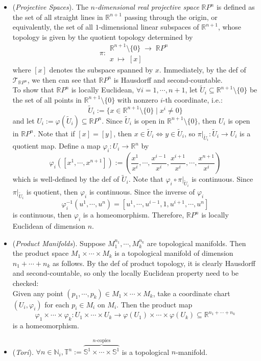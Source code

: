 \begin{itemize}
    \item (\textit{Projective Spaces}). The \textit{$n$-dimensional real projective space} $\mathbb{R}P^n$ is defined as the set of all straight lines in $\mathbb{R}^{n+1}$ passing through the origin, or equivalently, the set of all $1$-dimensional linear subspaces of $\mathbb{R}^{n+1}$, whose topology is given by the quotient topology determined by 
    $$\pi: \substack{\mathbb{R}^{n+1} \setminus \{0\} \;\to\; \mathbb{R}P^n\\
    x\;\mapsto\; [x]}$$
    where $[x]$ denotes the subspace spanned by $x$. Immediately, by the def of $\mathcal{T}_{\mathbb{R}P^n}$, we then can see that $\mathbb{R}P^n$ is Hausdorff and second-countable.\\
    To show that $\mathbb{R}P^n$ is locally Euclidean, $\forall i=1,\cdots, n+1$, let $\tilde{U}_i \subseteq \mathbb{R}^{n+1} \setminus \{0\}$ be the set of all points in $\mathbb{R}^{n+1} \setminus \{0\}$ with nonzero $i$-th coordinate, i.e.:
    \[
    \tilde{U}_i:= \{x\in \mathbb{R}^{n+1} \setminus \{0\} \mid x^i \neq 0\}
    \]
    and let $U_i:= \varphi(\tilde{U}_i) \subseteq \mathbb{R}P^n$. Since $\tilde{U}_i$ is open in $\mathbb{R}^{n+1} \setminus \{0\}$, then $U_i$ is open in $\mathbb{R}P^n$. Note that if $[x]=[y]$, then $x\in \tilde{U}_i \Leftrightarrow y\in \tilde{U}_i$, so $\pi|_{\tilde{U}_i}: \tilde{U}_i\to U_i$ is a quotient map. Define a map $\varphi_i: U_i \to \mathbb{R}^n$ by
    \[
    \varphi_i([x^1 ,\cdots, x^{n+1}]):= (\frac{x^1}{x^i} ,\cdots, \frac{x^{i-1}}{x^i} ,\frac{x^{i+1}}{x^i} ,\cdots, \frac{x^{n+1}}{x^i})
    \]
    which is well-defined by the def of $\tilde{U}_i$. Note that $\varphi_i \circ \pi|_{\tilde{U}_i}$ is continuous. Since $\pi|_{\tilde{U}_i}$ is quotient, then $\varphi_i$ is continuous. Since the inverse of $\varphi_i$
    \[
    \varphi_i^{-1}(u^1 ,\cdots, u^n)= [u^1 ,\cdots, u^{i-1},1, u^{i+1}, \cdots, u^n]
    \]
    is continuous, then $\varphi_i$ is a homeomorphism. Therefore, $\mathbb{R}P^n$ is locally Euclidean of dimension $n$.

    \item (\textit{Product Manifolds}). Suppose $M_1^{n_1} ,\cdots ,M_k^{n_k}$ are topological manifolds. Then the product space $M_1 \times \cdots \times M_k$ is a topological manifold of dimension $n_1 +\cdots +n_k$ as follows. By the def of product topology, it is clearly Hausdorff and second-countable, so only the locally Euclidean property need to be checked:\\
    Given any point $(p_1 ,\cdots,p_k) \in M_1 \times \cdots \times M_k$, take a coordinate chart $(U_i,\varphi_i)$ for each $p_i\in M_i$ on $M_i$. Then the product map
    \[
    \varphi_1 \times \cdots\times \varphi_k: U_1 \times \cdots \times U_k \to \varphi(U_1) \times \cdots \times \varphi(U_k) \subseteq \mathbb{R}^{n_1 +\cdots+ n_k}
    \]
    is a homeomorphism.

    \item (\textit{Tori}). $\forall n\in \mathbb{N}_i, \mathbb{T}^n:= \overbrace{\mathbb{S}^1 \times \cdots \times \mathbb{S}^1}^{n \text{-copies}}$ is a topological $n$-manifold.
\end{itemize}

